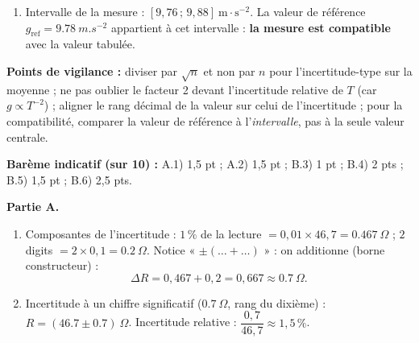 \documentclass[11pt]{article}
\begin{document}
\begin{corrige}
\begin{enumerate}
\begin{enumerate}
        \item Intervalle de la mesure : $[9,76\,;\,9,88]~\text{m}\cdot\text{s}^{-2}$. La valeur de référence $g_{\text{ref}} = \SI{9,78}{m.s^{-2}}$ appartient à cet intervalle : \textbf{la mesure est compatible} avec la valeur tabulée.
    \end{enumerate}
\end{enumerate}
\textbf{Points de vigilance :} diviser par $\sqrt{n}$ et non par $n$ pour l'incertitude-type sur la moyenne ; ne pas oublier le facteur 2 devant l'incertitude relative de $T$ (car $g \propto T^{-2}$) ; aligner le rang décimal de la valeur sur celui de l'incertitude ; pour la compatibilité, comparer la valeur de référence à l'\emph{intervalle}, pas à la seule valeur centrale.
\end{corrige}

\begin{corrige}
\textbf{Barème indicatif (sur 10) :} A.1) 1,5 pt ; A.2) 1,5 pt ; B.3) 1 pt ; B.4) 2 pts ; B.5) 1,5 pt ; B.6) 2,5 pts.

\textbf{Partie A.}
\begin{enumerate}
    \item Composantes de l'incertitude : $1\,\%$ de la lecture $= 0,01 \times 46,7 = \SI{0,467}{\Omega}$ ; $2$ digits $= 2 \times 0,1 = \SI{0,2}{\Omega}$. Notice « $\pm(\dots + \dots)$ » : on additionne (borne constructeur) :
    \[ \Delta R = 0,467 + 0,2 = 0,667 \approx \boxed{\SI{0,7}{\Omega}}. \]
    \item Incertitude à un chiffre significatif ($\SI{0,7}{\Omega}$, rang du dixième) : $\boxed{R = (\num{46,7} \pm \num{0,7})~\Omega}$. Incertitude relative : $\dfrac{0,7}{46,7} \approx \boxed{1,5\,\%}$.
\end{enumerate}


\end{corrige}
\end{document}

